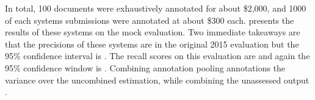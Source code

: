 In total, 100 documents were exhaustively annotated for about \$2,000, and 1000 of each systems submissions were annotated at about \$300 each.
 presents the results of these systems on the mock evaluation.
Two immediate takeaways are that the precisions of these systems are  in the original 2015 evaluation but the 95\% confidence interval is .
The recall scores on this evaluation are  and again the 95\% confidence window is .
Combining annotation pooling annotations  the variance over the uncombined estimation,
while combining the unassessed output .

